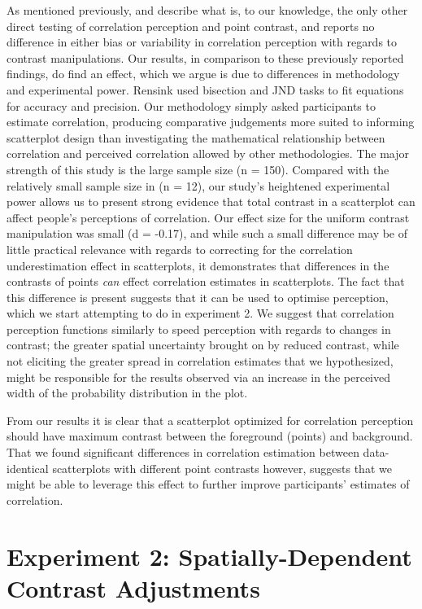 \documentclass[preprint, 3p,
authoryear]{elsarticle} %
\begin{document}
As mentioned previously, \citet{rensink_2012} and \citet{rensink_2014}
describe what is, to our knowledge, the only other direct testing of
correlation perception and point contrast, and reports no difference in
either bias or variability in correlation perception with regards to
contrast manipulations. Our results, in comparison to these previously
reported findings, do find an effect, which we argue is due to
differences in methodology and experimental power. Rensink used
bisection and JND tasks to fit equations for accuracy and precision. Our
methodology simply asked participants to estimate correlation, producing
comparative judgements more suited to informing scatterplot design than
investigating the mathematical relationship between correlation and
perceived correlation allowed by other methodologies. The major strength
of this study is the large sample size (n = 150). Compared with the
relatively small sample size in \citet{rensink_2014} (n = 12), our
study's heightened experimental power allows us to present strong
evidence that total contrast in a scatterplot can affect people's
perceptions of correlation. Our effect size for the uniform contrast
manipulation was small (d = -0.17), and while such a small difference
may be of little practical relevance with regards to correcting for the
correlation underestimation effect in scatterplots, it demonstrates that
differences in the contrasts of points \emph{can} effect correlation
estimates in scatterplots. The fact that this difference is present
suggests that it can be used to optimise perception, which we start
attempting to do in experiment 2. We suggest that correlation perception
functions similarly to speed perception \citep{champion_2017} with
regards to changes in contrast; the greater spatial uncertainty brought
on by reduced contrast, while not eliciting the greater spread in
correlation estimates that we hypothesized, might be responsible for the
results observed via an increase in the perceived width of the
probability distribution in the plot.

From our results it is clear that a scatterplot optimized for
correlation perception should have maximum contrast between the
foreground (points) and background. That we found significant
differences in correlation estimation between data-identical
scatterplots with different point contrasts however, suggests that we
might be able to leverage this effect to further improve participants'
estimates of correlation.

\hypertarget{experiment-2-spatially-dependent-contrast-adjustments}{%
\section{Experiment 2: Spatially-Dependent Contrast
Adjustments}\label{experiment-2-spatially-dependent-contrast-adjustments}}
\end{document}
